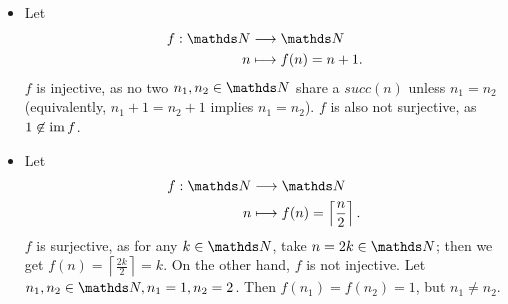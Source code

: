 \documentclass{homework}
\begin{document}
\begin{solution}
\begin{itemize}
\begin{itemize}
        \item Let \begin{align*}
            f: \N &\longrightarrow \N \\
            n &\longmapsto f(n) = n + 1
          .\end{align*}
          $f$ is injective, as no two $n_1,n_2\in \N$ share a $succ(n)$ unless  $n_1=n_2$
          (equivalently, $n_1+1 = n_2 + 1$ implies  $n_1=n_2$). $f$ is also not surjective, as $1\not\in
          \operatorname{im} f$.
        \item Let \begin{align*}
          f: \N &\longrightarrow \N \\
          n &\longmapsto f(n) = \left\lceil \frac{n}{2} \right\rceil 
        .\end{align*}
        $f$ is surjective, as for any $k \in \N$, take $n = 2k \in \N$; then we get $f(n) =
        \left\lceil \frac{2k}{2}\right\rceil = k$. On the other hand,  $f$ is not injective. Let
        $n_1, n_2\in \N, n_1 = 1, n_2 =2$. Then $f(n_1)=f(n_2)=1$, but $n_1\neq n_2$.
      \end{itemize}
  \end{itemize}
\end{solution}
\end{document}
